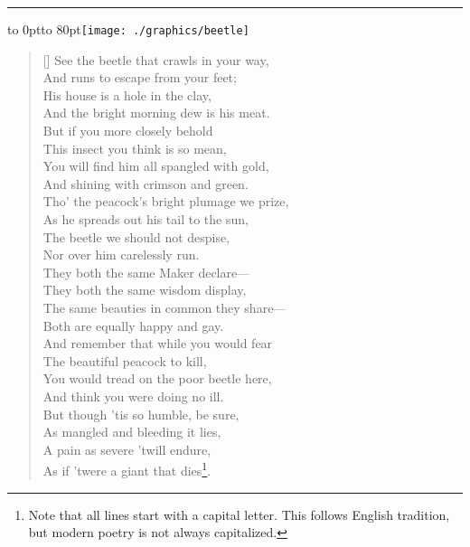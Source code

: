 \begin{teX}
\rule{0.2pt}{100pt}
\vbox to 0pt{\hfill\hbox to 80pt{\texttt{[image: ./graphics/beetle]}}}
\begin{verse}[\versewidth]
See the beetle that crawls in your way,\\
\vin And runs to escape from your feet;\\
His house is a hole in the clay,\\
\vin And the bright morning dew is his meat.\\
\bigskip
But if you more closely behold\\
\vin This insect you think is so mean,\\
You will find him all spangled with gold,\\
\vin And shining with crimson and green.\\
\bigskip
Tho' the peacock's bright plumage we prize,\\
\vin As he spreads out his tail to the sun,\\
The beetle we should not despise,\\
\vin Nor over him carelessly run.\\
\bigskip
They both the same Maker declare---\\
\vin They both the same wisdom display,\\
The same beauties in common they share---\\
\vin Both are equally happy and gay.\\
\bigskip
And remember that while you would fear\\
\vin The beautiful peacock to kill,\\
You would tread on the poor beetle here,\\
\vin And think you were doing no ill.\\
\bigskip
But though 'tis so humble, be sure,\\
\vin As mangled and bleeding it lies,\\
A pain as severe 'twill endure,\\
\vin As if 'twere a giant that dies\footnote{Note that all lines start with a capital letter. This follows English tradition, but modern poetry is not always capitalized.}.\\
\end{verse}
\end{teX}






